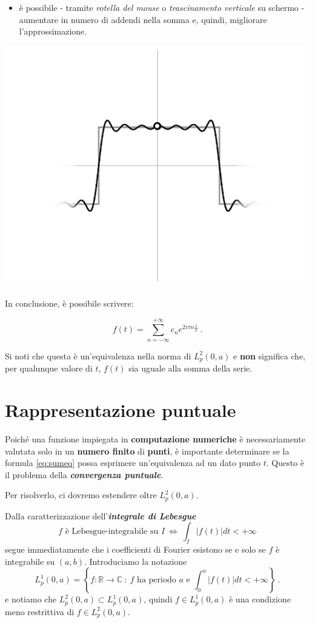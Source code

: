 \documentclass[
]{book}
\providecommand{\tightlist}{%
  \setlength{\itemsep}{0pt}\setlength{\parskip}{0pt}}
\begin{document}
\begin{itemize}
\tightlist
\item
  è possibile - tramite \emph{rotella del mouse} o \emph{trascinamento verticale} su schermo - aumentare in numero di addendi nella somma e, quindi, migliorare l'approssimazione.
\end{itemize}

\begin{center}\includegraphics[width=0.5\linewidth]{_images/approx} \end{center}

In conclusione, è possibile scrivere:

\begin{equation}
  f(t) = \sum_{n= - \infty}^{+ \infty} c_n e^{2 i \pi n \textstyle \frac {t}{a}} \ .
  \label{eq:sumeq}
\end{equation}

Si noti che questa è un'equivalenza nella norma di \(L_{p}^{2}(0,a)\) e \textbf{non} significa che, per qualunque valore di \(t\), \(f(t)\) sia uguale alla somma della serie.

\hypertarget{rapprpunt}{%
\section{Rappresentazione puntuale}\label{rapprpunt}}

Poiché una funzione impiegata in \textbf{computazione numeriche} è necessariamente valutata solo in un \textbf{numero finito} di \textbf{punti}, è importante determinare se la formula \eqref{eq:sumeq} possa esprimere un'equivalenza ad un dato punto \(t\).
Questo è il problema della \emph{\textbf{convergenza puntuale}}.

Per risolverlo, ci dovremo estendere oltre \(L^2_p(0,a)\).

Dalla caratterizzazione dell'\emph{\textbf{integrale di Lebesgue}}
\[ f \text{ è Lebesgue-integrabile su } I \ \iff \ \int_{I}|f(t)|dt < +\infty \]
segue immediatamente che i coefficienti di Fourier esistono se e solo se \(f\) è integrabile su \((a,b)\).
Introduciamo la notazione
\[L_{p}^{1}(0,a) = \left\{ f : \mathbb{R} \longrightarrow \mathbb{C} \ : \ f \text{ ha periodo } a  \text{ e } \int_{0}^{a}|f(t)|dt < +\infty \right\} \ .\]
e notiamo che \(L_p^2(0,a) \subset L_p^1(0,a)\), quindi \(f \in L_p^1(0,a)\) è una condizione meno restrittiva di \(f \in L_p^2(0,a)\).
\end{document}
